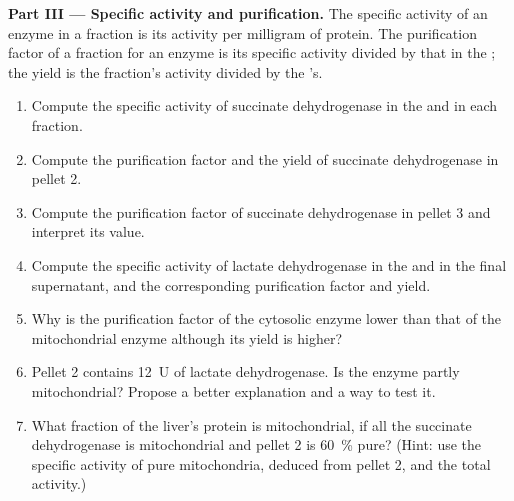 \begin{problem}
\medskip
\noindent\textbf{Part III --- Specific activity and purification.}
The specific activity of an enzyme in a fraction is its activity per
milligram of protein. The purification factor of a fraction for an
enzyme is its specific activity divided by that in the ; the
yield is the fraction's activity divided by the 's.
\begin{enumerate}[resume]
  \item Compute the specific activity of succinate dehydrogenase in the
         and in each fraction.
  \item Compute the purification factor and the yield of succinate
        dehydrogenase in pellet 2.
  \item Compute the purification factor of succinate dehydrogenase in
        pellet 3 and interpret its value.
  \item Compute the specific activity of lactate dehydrogenase in the
         and in the final supernatant, and the corresponding
        purification factor and yield.
  \item Why is the purification factor of the cytosolic enzyme lower
        than that of the mitochondrial enzyme although its yield is
        higher?
  \item Pellet 2 contains \qty{12}{U} of lactate dehydrogenase. Is the
        enzyme partly mitochondrial? Propose a better explanation and a
        way to test it.
  \item What fraction of the liver's protein is mitochondrial, if all
        the succinate dehydrogenase is mitochondrial and pellet 2 is
        \qty{60}{\%} pure? (Hint: use the specific activity of pure
        mitochondria, deduced from pellet 2, and the total activity.)
\end{enumerate}


\end{problem}
